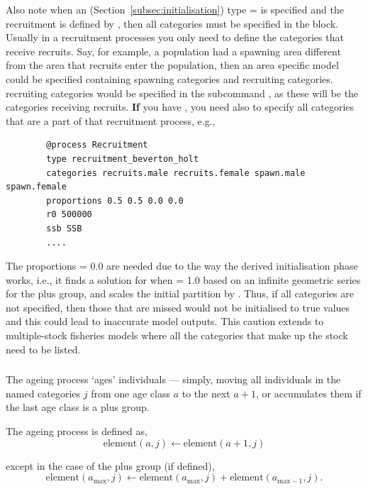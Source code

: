 Also note when an  (Section~\ref{subsec:initialisation}) type =  is specified and the recruitment is defined by , then all categories must be specified in the  block. Usually in a recruitment processes you only need to define the categories that receive recruits. Say, for example, a population had a spawning area different from the area that recruits enter the population, then an area specific model could be specified containing spawning categories and recruiting categories. recruiting categories would be specified in the subcommand , as these will be the categories receiving recruits. \textbf{If} you have ,  you need also to specify all categories that are a part of that recruitment process, e.g.,

{\small{\begin{verbatim}
		@process Recruitment
		type recruitment_beverton_holt
		categories recruits.male recruits.female spawn.male spawn.female
		proportions 0.5 0.5 0.0 0.0
		r0 500000
		ssb SSB
		....
		\end{verbatim}}}
The proportions = 0.0 are needed due to the way the derived initialisation phase works, i.e., it finds a solution for when  = 1.0 based on an infinite geometric series for the plus group, and scales the initial partition by . Thus, if all categories are not specified, then those that are missed would not be initialised to true values and this could lead to inaccurate model outputs. This caution extends to multiple-stock fisheries models where all the categories that make up the stock need to be listed.
\subsubsection{\label{sec:ageing}}

The ageing process `ages' individuals --- simply, moving all individuals in the named categories $j$ from one age class $a$ to the next $a + 1$, or accumulates them if the last age class is a plus group.

The ageing process is defined as,
\begin{equation}
  \text{element}(a,j) \leftarrow \text{element}(a + 1,j)
\end{equation}

except in the case of the plus group (if defined),
\begin{equation}
  \text{element}(a_{\text{max}}, j) \leftarrow \text{element}(a_{\text{max}}, j) + \text{element}(a_{\text{max}-1}, j).
\end{equation}

